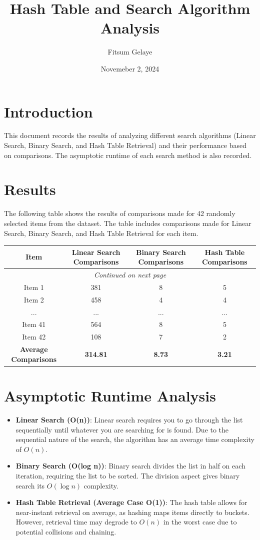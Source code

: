 \documentclass{article}
\title{Hash Table and Search Algorithm Analysis}
\author{Fitsum Gelaye}
\date{Novemeber 2, 2024}
\begin{document}
\maketitle

\section{Introduction}
This document records the results of analyzing different search algorithms (Linear Search, Binary Search, and Hash Table Retrieval) and their performance based on comparisons. The asymptotic runtime of each search method is also recorded.

\section{Results}
The following table shows the results of comparisons made for 42 randomly selected items from the dataset. The table includes comparisons made for Linear Search, Binary Search, and Hash Table Retrieval for each item.

\begin{longtable}{|c|c|c|c|}
\hline
\textbf{Item} & \textbf{Linear Search Comparisons} & \textbf{Binary Search Comparisons} & \textbf{Hash Table Comparisons} \\
\hline
\endhead
\hline
\multicolumn{4}{|c|}{\textit{Continued on next page}} \\
\hline
\endfoot
\hline
\endlastfoot
Item 1 & 381 & 8 & 5 \\
Item 2 & 458 & 4 & 4 \\
... & ... & ... & ... \\
Item 41 & 564 & 8 & 5 \\
Item 42 & 108 & 7 & 2 \\
\hline
\textbf{Average Comparisons} & \textbf{314.81} & \textbf{8.73} & \textbf{3.21} \\
\hline
\end{longtable}

\section{Asymptotic Runtime Analysis}

\begin{itemize}
    \item \textbf{Linear Search (O(n))}: Linear search requires you to go through the list sequentially until whatever you are searching for is found. Due to the sequential nature of the search, the algorithm has an average time complexity of \( O(n) \).
    
    \item \textbf{Binary Search (O(log n))}: Binary search divides the list in half on each iteration, requiring the list to be sorted. The division aspect gives binary search its \( O(\log n) \) complexity.
    
    \item \textbf{Hash Table Retrieval (Average Case O(1))}: The hash table allows for near-instant retrieval on average, as hashing maps items directly to buckets. However, retrieval time may degrade to \( O(n) \) in the worst case due to potential collisions and chaining.
\end{itemize}
\end{document}
